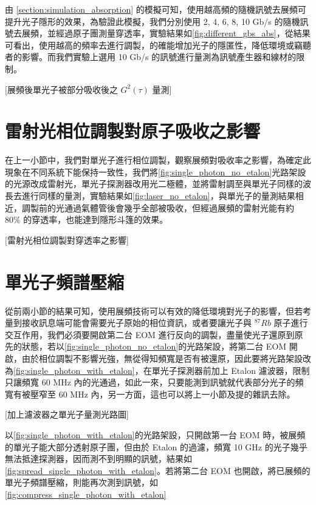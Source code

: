 \documentclass[class=NCU_thesis, crop=false]{standalone}
\begin{document}
由 \ref{section:simulation_absorption} 的模擬可知，使用越高頻的隨機訊號去展頻可提升光子隱形的效果，為驗證此模擬，我們分別使用 2, 4, 6, 8, 10 Gb/s 的隨機訊號去展頻，並經過原子團測量穿透率，實驗結果如\cref{fig:different_gbs_abs}，從結果可看出，使用越高的頻率去進行調製，的確能增加光子的隱匿性，降低環境或竊聽者的影響。而我們實驗上選用 10 Gb/s 的訊號進行量測為訊號產生器和線材的限制。


[展頻後單光子被部分吸收後之 $G^{2}(\tau)$ 量測]

\section{雷射光相位調製對原子吸收之影響}
在上一小節中，我們對單光子進行相位調製，觀察展頻對吸收率之影響，為確定此現象在不同系統下能保持一致性，我們將\cref{fig:single_photon_no_etalon}光路架設的光源改成雷射光，單光子探測器改用光二極體，並將雷射調至與單光子同樣的波長去進行同樣的量測，實驗結果如\cref{fig:laser_no_etalon}，與單光子的量測結果相近，調製前的光通過氣體管後會幾乎全部被吸收，但經過展頻的雷射光能有約 80\% 的穿透率，也能達到隱形斗篷的效果。

[雷射光相位調製對穿透率之影響]

\section{單光子頻譜壓縮}

從前兩小節的結果可知，使用展頻技術可以有效的降低環境對光子的影響，但若考量到接收訊息端可能會需要光子原始的相位資訊，或者要讓光子與 $^{87}Rb$ 原子進行交互作用，我們必須要開啟第二台 EOM 進行反向的調製，盡量使光子還原到原先的狀態，若以\cref{fig:single_photon_no_etalon}的光路架設，將第二台 EOM 開啟，由於相位調製不影響光強，無從得知頻寬是否有被還原，因此要將光路架設改為\cref{fig:single_photon_with_etalon}，在單光子探測器前加上 Etalon 濾波器，限制只讓頻寬 60 MHz 內的光通過，如此一來，只要能測到訊號就代表部分光子的頻寬有被壓窄至 60 MHz 內，另一方面，這也可以將上一小節及提的雜訊去除。

[加上濾波器之單光子量測光路圖]

以\cref{fig:single_photon_with_etalon}的光路架設，只開啟第一台 EOM 時，被展頻的單光子能大部分透射原子團，但由於 Etalon 的過濾，頻寬 10 GHz 的光子幾乎無法抵達探測器，因而測不到明顯的訊號，結果如\cref{fig:spread_single_photon_with_etalon}。若將第二台 EOM 也開啟，將已展頻的單光子頻譜壓縮，則能再次測到訊號，如\cref{fig:compress_single_photon_with_etalon}
\end{document}
